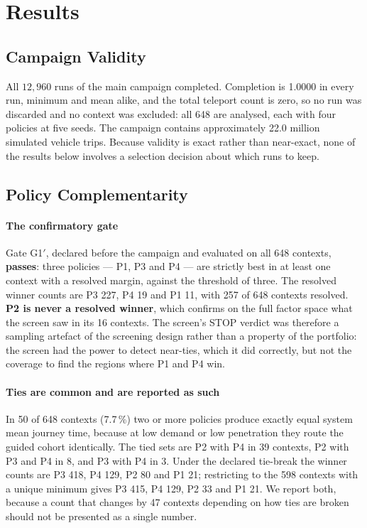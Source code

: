 
\section{Results}
\label{sec:results}

\subsection{Campaign Validity}
\label{sec:validity}

All $12{,}960$ runs of the main campaign completed. Completion is 1.0000 in
every run, minimum and mean alike, and the total teleport count is zero, so no
run was discarded and no context was excluded: all 648 are analysed, each with
four policies at five seeds. The campaign contains approximately 22.0 million
simulated vehicle trips. Because validity is exact rather than near-exact, none
of the results below involves a selection decision about which runs to keep.

\subsection{Policy Complementarity}
\label{sec:complementarity}

\paragraph{The confirmatory gate}
Gate G1$'$, declared before the campaign and evaluated on all 648 contexts,
\textbf{passes}: three policies --- P1, P3 and P4 --- are strictly best in at
least one context with a resolved margin, against the threshold of three. The
resolved winner counts are P3 227, P4 19 and P1 11, with 257 of 648 contexts
resolved. \textbf{P2 is never a resolved winner}, which confirms on the full
factor space what the screen saw in its 16 contexts. The screen's STOP verdict
was therefore a sampling artefact of the screening design rather than a property
of the portfolio: the screen had the power to detect near-ties, which it did
correctly, but not the coverage to find the regions where P1 and P4 win.

\paragraph{Ties are common and are reported as such}
In 50 of 648 contexts (7.7\,\%) two or more policies produce exactly equal system
mean journey time, because at low demand or low penetration they route the guided
cohort identically. The tied sets are P2 with P4 in 39 contexts, P2 with P3 and
P4 in 8, and P3 with P4 in 3. Under the declared tie-break the winner counts are
P3 418, P4 129, P2 80 and P1 21; restricting to the 598 contexts with a unique
minimum gives P3 415, P4 129, P2 33 and P1 21. We report both, because a count
that changes by 47 contexts depending on how ties are broken should not be
presented as a single number.

